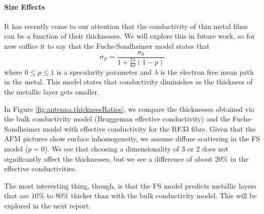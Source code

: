 \paragraph*{Size Effects}
It has recently come to our attention that the conductivity 
of thin metal films can be a function of their thicknesses. 
We will explore this in future work, so for now 
suffice it to say that the Fuchs-Sondheimer model states
that
  \begin{equation}
      \sigma_F = \frac{\sigma_0}{1+\frac{3\lambda}{8d}\left(1-p\right)}
  \end{equation}
where $0\leq p\leq1$ is a specularity parameter and $\lambda$ is the 
electron free mean path in the metal. This model states that conductivity
diminishes as the thickness of the metallic layer gets smaller.


In Figure \ref{fig:antenna.thicknessRatios}, we compare the 
thicknesses obtained via the bulk conductivity model (Bruggeman 
effective conductivity) and the Fuchs-Sondheimer model with 
effective conductivity for the RF33 fibre. Given that the AFM pictures
show surface inhomogeneity, we assume diffuse scattering in 
the FS model ($p=0$). We see that choosing a dimensionality 
of 3 or 2 does not significantly affect the thicknesses, but
we see a difference of about 20\% in the effective conductivities.

The most interesting thing, though, is that the FS
model predicts metallic layers that are 10\% to 80\% thicker 
than with the bulk conductivity model. This will be explored 
in the next report. 

